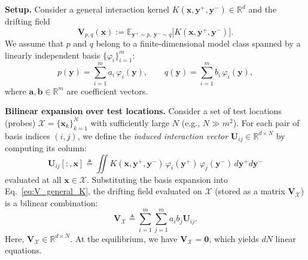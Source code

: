 \documentclass{article}
\renewcommand{\paragraph}[1]{\vspace{.05em}\noindent\textbf{#1}}
\theoremstyle{plain}
\theoremstyle{definition}
\theoremstyle{remark}
\begin{document}
\paragraph{Setup.}
Consider a general interaction kernel $K(\mathbf{x},\mathbf{y}^+,\mathbf{y}^-) \in \mathbb{R}^d$ and the drifting field
\begin{equation}
\mathbf{V}_{p,q}(\mathbf{x}) := \mathbb{E}_{\mathbf{y}^+\sim p,\ \mathbf{y}^-\sim q} \big[ K(\mathbf{x},\mathbf{y}^+,\mathbf{y}^-) \big].
\label{eq:V_general_K}
\end{equation}
We assume that $p$ and $q$ belong to a finite-dimensional model class spanned by a linearly independent basis $\{\varphi_i\}_{i=1}^m$:
\begin{equation}
p(\mathbf{y})=\sum_{i=1}^m a_i\,\varphi_i(\mathbf{y}),\qquad
q(\mathbf{y})=\sum_{i=1}^m b_i\,\varphi_i(\mathbf{y}),
\label{eq:pq_basis}
\end{equation}
where $\mathbf{a},\mathbf{b}\in\mathbb{R}^m$ are coefficient vectors.

\paragraph{Bilinear expansion over test locations.}
Consider a set of test locations (probes) $\mathcal{X} = \{\mathbf{x}_k\}_{k=1}^N$ with sufficiently large $N$ (e.g., $N \gg m^2$).
For each pair of basis indices $(i,j)$, we define the \emph{induced interaction vector} $\mathbf{U}_{ij} \in \mathbb{R}^{d{\times}N}$ by computing its column:
\begin{equation}
\mathbf{U}_{ij}[:, \mathbf{x}] \triangleq \iint K(\mathbf{x},\mathbf{y}^+,\mathbf{y}^-)\, \varphi_i(\mathbf{y}^+)\,\varphi_j(\mathbf{y}^-)\,d\mathbf{y}^+d\mathbf{y}^-
\end{equation}
evaluated at all $\mathbf{x} \in \mathcal{X}$.
Substituting the basis expansion into Eq.~\eqref{eq:V_general_K}, the drifting field evaluated on $\mathcal{X}$ (stored as a matrix $\mathbf{V}_{\mathcal{X}}$) is a bilinear combination:
\begin{equation}
\mathbf{V}_{\mathcal{X}} \triangleq \sum_{i=1}^m \sum_{j=1}^m a_i b_j \mathbf{U}_{ij}.
\end{equation}
Here, $\mathbf{V}_{\mathcal{X}} \in \mathbb{R}^{d{\times}N}$. At the equilibrium, we have $\mathbf{V}_{\mathcal{X}}=\textbf{0}$, which yields $dN$ linear equations.
\end{document}
